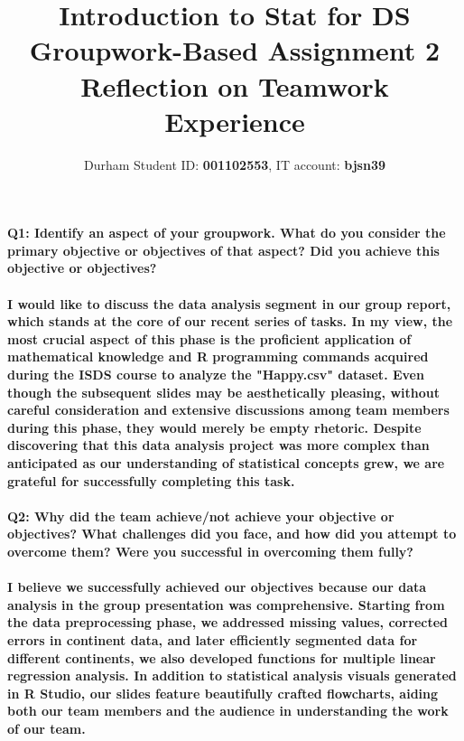 \documentclass[11pt]{article} %
\title{Introduction to Stat for DS Groupwork-Based Assignment 2 \\ Reflection on Teamwork Experience}
\author{Durham Student ID: \textbf{001102553}, IT account: \textbf{bjsn39}}
\begin{document}
\maketitle
% 
% 
% 
\paragraph{\textbf{Q1: Identify an aspect of your groupwork. What do you consider the primary objective or objectives of that aspect? Did you achieve this objective or objectives?}}
% 
% 
\paragraph{I would like to discuss the data analysis segment in our group report, which stands at the core of our recent series of tasks. In my view, the most crucial aspect of this phase is the proficient application of mathematical knowledge and R programming commands acquired during the ISDS course to analyze the "Happy.csv" dataset. Even though the subsequent slides may be aesthetically pleasing, without careful consideration and extensive discussions among team members during this phase, they would merely be empty rhetoric. Despite discovering that this data analysis project was more complex than anticipated as our understanding of statistical concepts grew, we are grateful for successfully completing this task.}
% 
% 
\paragraph{\textbf{Q2: Why did the team achieve/not achieve your objective or objectives? What challenges did you face, and how did you attempt to overcome them? Were you successful in overcoming them fully?}}
% 
% 
\paragraph{I believe we successfully achieved our objectives because our data analysis in the group presentation was comprehensive. Starting from the data preprocessing phase, we addressed missing values, corrected errors in continent data, and later efficiently segmented data for different continents, we also developed functions for multiple linear regression analysis. In addition to statistical analysis visuals generated in R Studio, our slides feature beautifully crafted flowcharts, aiding both our team members and the audience in understanding the work of our team.}
% 
\end{document}
